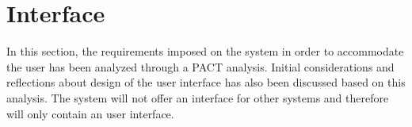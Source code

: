 \section{Interface}\label{sc:interface}
In this section, the requirements imposed on the system in order to accommodate the user has been analyzed through a PACT analysis. Initial considerations and reflections about design of the user interface has also been discussed based on this analysis. The system will not offer an interface for other systems and therefore will only contain an user interface.
\par